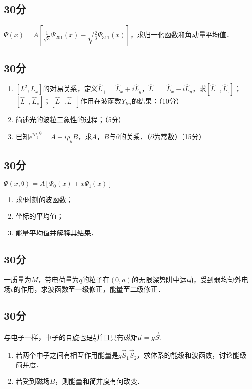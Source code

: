 
\subsection{30分}
$\varPsi (x)=A[\frac{1}{\sqrt{3}}\varPsi_{201}(x)-\sqrt{\frac{2}{3}}\varPsi_{311}(x)]$，求归一化函数和角动量平均值．
\subsection{30分}
\begin{enumerate}
\item $[L^{2},L_{x}]$的对易关系，定义$\hat{L}_{+}=\hat{L}_{x}+i\hat{L}_{y}$，$\hat{L}_{-}=\hat{L}_{x}-i\hat{L}_{y}$，求$[\hat{L}_{+},\hat{L}_{z}]$；$[\hat{L}_{-},\hat{L}_{z}]$；$[\hat{L}_{+},\hat{L}_{-}]$作用在波函数$Y_{lm}$的结果；（10分）
\item 简述光的波粒二象性的过程；（5分）
\item 已知$e^{i\rho_{y}\partial}=A+i\rho_{y}B$，求$A$，$B$与$\partial$的关系．（$\partial$为常数）（15分）
\end{enumerate}
\subsection{30分}
$\varPsi (x,0)=A[\varPsi_{0}(x)+x\varPsi_{1}(x)]$\\
\begin{enumerate}
\item 求$t$时刻的波函数；
\item 坐标的平均值；
\item 能量平均值并解释其结果．
\end{enumerate}
\subsection{30分}
一质量为$M$，带电荷量为$q$的粒子在$(0,a)$的无限深势阱中运动，受到弱均匀外电场$\epsilon$的作用，求波函数至一级修正，能量至二级修正．
\subsection{30分}
与电子一样，中子的自旋也是$\frac{1}{2}$并且具有磁矩$\vec{\mu}=g\vec{S}$.
\begin{enumerate}
\item 若两个中子之间有相互作用能量是$g\vec{S}_{1}\vec{S}_{2}$，求体系的能级和波函数，讨论能级简并度．
\item 若受到磁场$B$，则能量和简并度有何改变．
\end{enumerate}